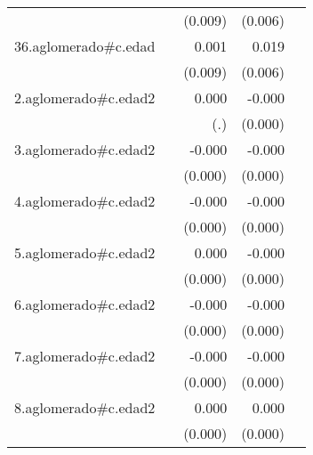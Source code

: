 {\begin{longtable}{l*{4}{D{.}{.}{-1}}}
            &                     &     (0.009)         &     (0.006)         &                     \\
\addlinespace
36.aglomerado#c.edad&                     &       0.001         &       0.019\sym{***}&                     \\
            &                     &     (0.009)         &     (0.006)         &                     \\
\addlinespace
2.aglomerado#c.edad2&                     &       0.000         &      -0.000         &                     \\
            &                     &         (.)         &     (0.000)         &                     \\
\addlinespace
3.aglomerado#c.edad2&                     &      -0.000         &      -0.000\sym{*}  &                     \\
            &                     &     (0.000)         &     (0.000)         &                     \\
\addlinespace
4.aglomerado#c.edad2&                     &      -0.000         &      -0.000\sym{*}  &                     \\
            &                     &     (0.000)         &     (0.000)         &                     \\
\addlinespace
5.aglomerado#c.edad2&                     &       0.000         &      -0.000         &                     \\
            &                     &     (0.000)         &     (0.000)         &                     \\
\addlinespace
6.aglomerado#c.edad2&                     &      -0.000         &      -0.000\sym{***}&                     \\
            &                     &     (0.000)         &     (0.000)         &                     \\
\addlinespace
7.aglomerado#c.edad2&                     &      -0.000         &      -0.000         &                     \\
            &                     &     (0.000)         &     (0.000)         &                     \\
\addlinespace
8.aglomerado#c.edad2&                     &       0.000         &       0.000         &                     \\
            &                     &     (0.000)         &     (0.000)         &                     \\

\end{longtable}}
